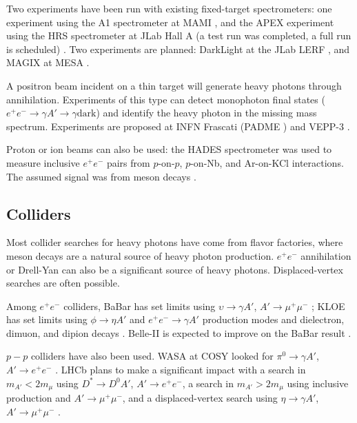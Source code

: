 Two experiments have been run with existing fixed-target spectrometers: one experiment using the A1 spectrometer at MAMI \cite{merkel_search_2014}, and the APEX experiment using the HRS spectrometer at JLab Hall A (a test run was completed, a full run is scheduled) \cite{essig_electron_2011,abrahamyan_search_2011}.
Two experiments are planned: DarkLight at the JLab LERF \cite{balewski_darklight_2014}, and MAGIX at MESA \cite{denig_recent_2016}.

A positron beam incident on a thin target will generate heavy photons through annihilation.
Experiments of this type can detect monophoton final states ($e^+e^- \to \gamma A' \to \gamma \mathrm{dark}$) and identify the heavy photon in the missing mass spectrum. Experiments are proposed at INFN Frascati (PADME \cite{raggi_padme_2015}) and VEPP-3 \cite{wojtsekhowski_searching_2012}.

Proton or ion beams can also be used: the HADES spectrometer was used to measure inclusive $e^+e^-$ pairs from $p$-on-$p$, $p$-on-Nb, and Ar-on-KCl interactions.
The assumed signal was from meson decays \cite{hades_collaboration_searching_2013}.

\subsection{Colliders}
Most collider searches for heavy photons have come from flavor factories, where meson decays are a natural source of heavy photon production.
$e^+e^-$ annihilation or Drell-Yan can also be a significant source of heavy photons.
Displaced-vertex searches are often possible.

Among $e^+e^-$ colliders, BaBar has set limits using $\upsilon \to \gamma A'$, $A'\to\mu^+\mu^-$ \cite{babar_collaboration_search_2009,soffer_constraints_2014}; KLOE has set limits using $\phi\to \eta A'$ and $e^+e^- \to \gamma A'$ production modes and dielectron, dimuon, and dipion decays \cite{collaboration_search_2012,collaboration_limit_2013,babusci_search_2014,anastasi_limit_2015,collaboration_limit_2016}.
Belle-II is expected to improve on the BaBar result \cite{inguglia_belle_2016}.

$p-p$ colliders have also been used. WASA at COSY looked for $\pi^0 \to \gamma A'$, $A'\to e^+e^-$ \cite{collaboration_search_2013}.
LHCb plans to make a significant impact with a search in $m_{A'}<2m_\mu$ using $D^* \to D^0 A'$, $A'\to e^+e^-$, a search in $m_{A'}>2m_\mu$ using inclusive production and $A'\to \mu^+\mu^-$, and a displaced-vertex search using $\eta \to \gamma A'$, $A'\to \mu^+\mu^-$ \cite{ilten_dark_2015,ilten_inclusive_2016}.

